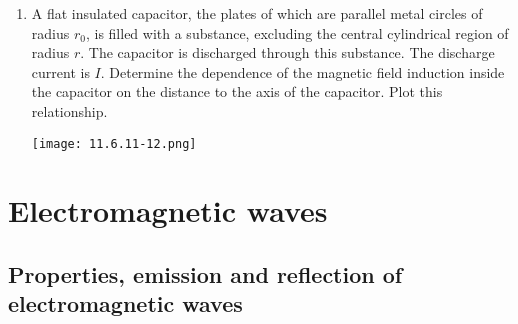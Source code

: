 \documentclass{article}
\begin{document}
\begin{enumerate}[label=11.6.\arabic*]
\item A flat insulated capacitor, the plates of which are parallel metal circles of radius $r_0$, is filled with a substance, excluding the central cylindrical region of radius $r$. The capacitor is discharged through this substance. The discharge current is $I$. Determine the dependence of the magnetic field induction inside the capacitor on the distance to the axis of the capacitor. Plot this relationship.

\begin{center}
    \texttt{[image: 11.6.11-12.png]}
\end{center}



\end{enumerate}


\section{Electromagnetic waves}

\subsection{Properties, emission and reflection of electromagnetic waves}
\end{document}
